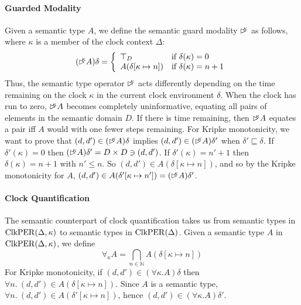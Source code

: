 \paragraph{Guarded Modality} Given a semantic type $A$, we define the
semantic guard modality $\mathord{\rhd\kern-0.4em^{\kappa}}$ as follows, where $\kappa$ is a
member of the clock context $\Delta$:
\begin{displaymath}
  (\mathord{\rhd\kern-0.4em^{\kappa}} A)\delta = \left\{
    \begin{array}{ll}
      \top_D & \textrm{if }\delta(\kappa) = 0 \\
      A(\delta[\kappa \mapsto n]) & \textrm{if }\delta(\kappa) = n + 1
    \end{array}
  \right.
\end{displaymath}
Thus, the semantic type operator $\mathord{\rhd\kern-0.4em^{\kappa}}$ acts differently
depending on the time remaining on the clock $\kappa$ in the current
clock environment $\delta$. When the clock has run to zero,
$\mathord{\rhd\kern-0.4em^{\kappa}} A$ becomes completely uninformative, equating all pairs
of elements in the semantic domain $D$. If there is time remaining,
then $\mathord{\rhd\kern-0.4em^{\kappa}} A$ equates a pair iff $A$ would with one fewer
steps remaining. For Kripke monotonicity, we want to prove that
$(d,d') \in (\mathord{\rhd\kern-0.4em^{\kappa}} A)\delta$ implies $(d,d') \in (\mathord{\rhd\kern-0.4em^{\kappa}}
A)\delta'$ when $\delta' \sqsubseteq \delta$. If $\delta'(\kappa) = 0$
then $(\mathord{\rhd\kern-0.4em^{\kappa}} A)\delta' = D \times D \ni (d,d')$. If
$\delta'(\kappa) = n' + 1$ then $\delta(\kappa) = n + 1$ with $n' \leq
n$. So $(d,d') \in A(\delta[\kappa \mapsto n])$, and so by the Kripke
monotonicity for $A$, $(d,d') \in A(\delta'[\kappa \mapsto n']) =
(\mathord{\rhd\kern-0.4em^{\kappa}} A)\delta'$.

\paragraph{Clock Quantification}
The semantic counterpart of clock quantification takes us from
semantic types in $\mathrm{ClkPER}(\Delta, \kappa)$ to semantic types in
$\mathrm{ClkPER}(\Delta)$. Given a semantic type $A$ in $\mathrm{ClkPER}(\Delta,
\kappa)$, we define
\begin{displaymath}
  \forall_\kappa A = \bigcap_{n \in \mathbb{N}} A(\delta[\kappa \mapsto n])
\end{displaymath}
For Kripke monotonicity, if $(d,d') \in (\forall\kappa. A)\delta$ then
$\forall n.\ (d,d') \in A(\delta[\kappa \mapsto n])$. Since $A$ is a
semantic type, $\forall n.\ (d,d') \in A(\delta'[\kappa \mapsto n])$,
hence $(d,d') \in (\forall\kappa. A)\delta'$.

